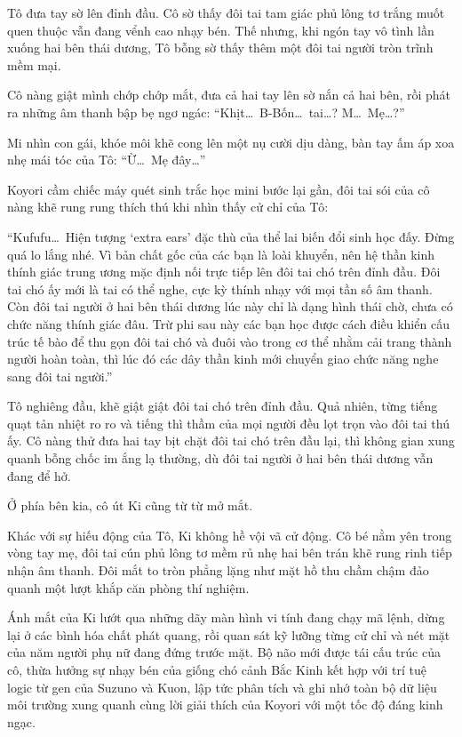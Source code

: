\documentclass[../main.tex]{subfiles}
\begin{document}
Tô đưa tay sờ lên đỉnh đầu. Cô sờ thấy đôi tai tam giác phủ lông tơ trắng muốt quen thuộc vẫn đang vểnh cao nhạy bén. Thế nhưng, khi ngón tay vô tình lần xuống hai bên thái dương, Tô bỗng sờ thấy thêm một đôi tai người tròn trĩnh mềm mại.

Cô nàng giật mình chớp chớp mắt, đưa cả hai tay lên sờ nắn cả hai bên, rồi phát ra những âm thanh bập bẹ ngơ ngác: ``Khịt\dots\ B-Bốn\dots\ tai\dots? M\dots\ Mẹ\dots?''

Mi nhìn con gái, khóe môi khẽ cong lên một nụ cười dịu dàng, bàn tay ấm áp xoa nhẹ mái tóc của Tô: ``Ừ\dots\ Mẹ đây\dots''

Koyori cầm chiếc máy quét sinh trắc học mini bước lại gần, đôi tai sói của cô nàng khẽ rung rung thích thú khi nhìn thấy cử chỉ của Tô:

``Kufufu\dots\ Hiện tượng `extra ears' đặc thù của thể lai biến đổi sinh học đấy. Đừng quá lo lắng nhé. Vì bản chất gốc của các bạn là loài khuyển, nên hệ thần kinh thính giác trung ương mặc định nối trực tiếp lên đôi tai chó trên đỉnh đầu. Đôi tai chó ấy mới là tai có thể nghe, cực kỳ thính nhạy với mọi tần số âm thanh. Còn đôi tai người ở hai bên thái dương lúc này chỉ là dạng hình thái chờ, chưa có chức năng thính giác đâu. Trừ phi sau này các bạn học được cách điều khiển cấu trúc tế bào để thu gọn đôi tai chó và đuôi vào trong cơ thể nhằm cải trang thành người hoàn toàn, thì lúc đó các dây thần kinh mới chuyển giao chức năng nghe sang đôi tai người.''

Tô nghiêng đầu, khẽ giật giật đôi tai chó trên đỉnh đầu. Quả nhiên, từng tiếng quạt tản nhiệt ro ro và tiếng thì thầm của mọi người đều lọt trọn vào đôi tai thú ấy. Cô nàng thử đưa hai tay bịt chặt đôi tai chó trên đầu lại, thì không gian xung quanh bỗng chốc im ắng lạ thường, dù đôi tai người ở hai bên thái dương vẫn đang để hở.

Ở phía bên kia, cô út Ki cũng từ từ mở mắt.

Khác với sự hiếu động của Tô, Ki không hề vội vã cử động. Cô bé nằm yên trong vòng tay mẹ, đôi tai cún phủ lông tơ mềm rủ nhẹ hai bên trán khẽ rung rinh tiếp nhận âm thanh. Đôi mắt to tròn phẳng lặng như mặt hồ thu chầm chậm đảo quanh một lượt khắp căn phòng thí nghiệm.

Ánh mắt của Ki lướt qua những dãy màn hình vi tính đang chạy mã lệnh, dừng lại ở các bình hóa chất phát quang, rồi quan sát kỹ lưỡng từng cử chỉ và nét mặt của năm người phụ nữ đang đứng trước mặt. Bộ não mới được tái cấu trúc của cô, thừa hưởng sự nhạy bén của giống chó cảnh Bắc Kinh kết hợp với trí tuệ logic từ gen của Suzuno và Kuon, lập tức phân tích và ghi nhớ toàn bộ dữ liệu môi trường xung quanh cùng lời giải thích của Koyori với một tốc độ đáng kinh ngạc.
\end{document}
